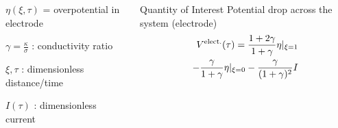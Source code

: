 \documentclass[10pt,xcolor=dvipsnames,compress]{beamer}
\begin{document}
\begin{frame}
\begin{columns}
\begin{column}{.49\textwidth}
\end{column}
\end{columns}
\begin{columns}
\begin{column}{.47\textwidth}
\begin{itemize}
\begin{small}
\item $\eta(\xi,\tau)$ = overpotential in electrode\\
\item $\gamma = \frac{\kappa}{\sigma}$ : conductivity ratio \\
\item $\xi, \tau$ : dimensionless distance/time \\
\item $I(\tau)$ : dimensionless current
\end{small}
\end{itemize}
\end{column}
\begin{column}{.47\textwidth}
\begin{alertblock}{Quantity of Interest}
 Potential drop across the system (electrode)
 \vspace{-0.1in}
\begin{eqnarray*}
V^{\rm elect.}(\tau) =  \frac{1+2\gamma}{1+\gamma}\eta|_{\xi=1} \\
- \frac{\gamma}{1+\gamma}\eta|_{\xi=0} 
 - \frac{\gamma}{(1+\gamma)^2}I
\end{eqnarray*}
\end{alertblock}
\end{column}
\end{columns}

\vfill
\end{frame}
\end{document}
